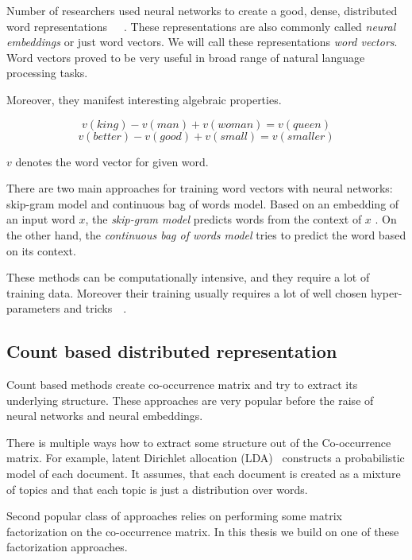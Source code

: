    Number of researchers used neural networks to create a good, dense, distributed word representations~\cite{pennington2014glove}~\cite{DBLP:conf/icml/LeM14}~\cite{rong2014word2vec}. %
    These representations are also commonly called \emph{neural embeddings} or just word vectors.
    We will call these representations \emph{word vectors}.
    Word vectors proved to be very useful in broad range of natural language processing tasks. 
    
    Moreover, they manifest interesting algebraic properties. 
    
    $$v(king) - v(man) + v(woman) = v(queen)$$
    $$v(better) - v(good) + v(small) = v(smaller)$$
    
    $v$ denotes the word vector for given word.
    
    There are two main approaches for training word vectors with neural networks: skip-gram model and continuous bag of words model.
    Based on an embedding of an input word $x$, the \textit{skip-gram model} predicts words from the context of $x$ .
    On the other hand, the \textit{continuous bag of words model} tries to predict the word based on its context.
    
    These methods can be computationally intensive, and they require a lot of training data. 
    Moreover their training usually requires a lot of well chosen hyper-parameters and tricks~\cite{DBLP:journals/corr/MikolovSCCD13}~\cite{vajdova2017}. %
    

    \subsection{Count based distributed representation}
    
    Count based methods create co-occurrence matrix and try to extract its underlying structure.
    These approaches are very popular before the raise of neural networks and neural embeddings.
    
    There is multiple ways how to extract some structure out of the Co-occurrence matrix.
    For example, latent Dirichlet allocation (LDA)~\cite{blei2003latent} constructs a probabilistic model of each document. 
    It assumes, that each document is created as a mixture of topics and that each topic is just a distribution over words. 
    
    Second popular class of approaches relies on performing some matrix factorization on the co-occurrence matrix.
    In this thesis we build on one of these factorization approaches.
    
